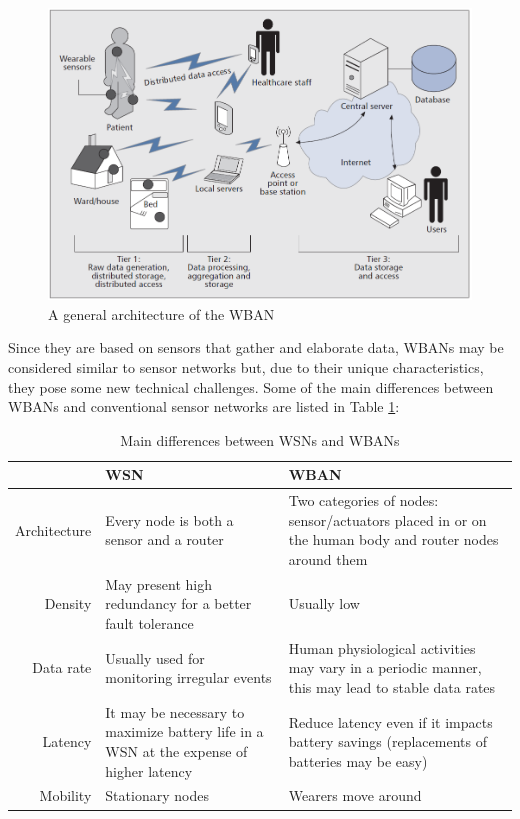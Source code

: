 \documentclass[conference]{IEEEtran}
\begin{document}
\begin{figure}[htbp]
\centering
\includegraphics[width=0.8\linewidth]{img/WBAN_arch.png}
\caption{A general architecture of the WBAN}
\label{fig_WBAN_arch}
\end{figure}

Since they are based on sensors that gather and elaborate data, WBANs may be considered similar to sensor networks but, due to their unique characteristics, they pose some new technical challenges. Some of the main differences between WBANs and conventional sensor networks are listed in Table \ref{tab1}:

\begin{table}[htbp]
	\caption{Main differences between WSNs and WBANs}
	\begin{tabularx}{0.5\textwidth}{r|X|X|}
	 & \textbf{WSN} & \textbf{WBAN} \\
	\hline
	Architecture & Every node is both a sensor and a router & Two categories of nodes: sensor/actuators placed in or on the human body and router nodes around them \\
	\hline
	Density & May present high redundancy for a better fault tolerance & Usually low \\
	\hline
	Data rate & Usually used for monitoring irregular events & Human physiological activities may vary in a periodic manner, this may lead to stable data rates \\
	\hline
	Latency	& It may be necessary to maximize battery life in a WSN at the expense of higher latency & Reduce latency even if it impacts battery savings (replacements of batteries may be easy) \\
	\hline
	Mobility & Stationary nodes & Wearers move around \\
	\hline
	\end{tabularx}
	\label{tab1}
	\end{table}
\end{document}
